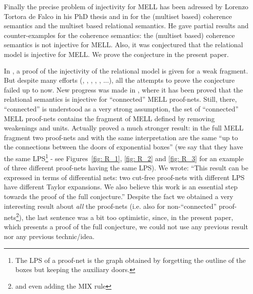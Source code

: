 \documentclass{article}
\theoremstyle{plain}
\begin{document}
Finally the precise problem of  injectivity for MELL has been adressed by Lorenzo Tortora de Falco in his PhD thesis \cite{phdtortora} and in \cite{injectcoh} for the (multiset based) coherence semantics and the multiset based relational semantics. 
He gave partial results and counter-examples for the coherence semantics: the (multiset based) coherence semantics is not injective for MELL.  
Also, it was conjectured that the relational model is
injective for MELL. We prove the conjecture in the present paper.



In \cite{injectcoh}, a proof of the injectivity of the relational model is given for a weak fragment. 
But despite many efforts (\cite{phdtortora}, \cite{injectcoh}, \cite{boudesunifying}, \cite{pagani06a}, \cite{separationdiff}, \cite{taylorexpansioninverse}...), all
the attempts to prove the conjecture failed up to now. 
New progress was made in \cite{LPSinjectivity}, where it has been proved that the relational semantics is injective for ``connected'' MELL proof-nets. Still, there, ``connected'' is understood as a very strong assumption, the set of ``connected'' MELL proof-nets contains the fragment of MELL defined by removing weakenings and units. Actually \cite{LPSinjectivity} proved a much stronger result: in the full MELL fragment two proof-nets  and  with the same
interpretation are the same ``up to the connections between the doors of exponential
boxes'' (we say that they have the same LPS\footnote{The LPS of a proof-net is the graph obtained by forgetting the outline of the boxes but keeping the auxiliary doors.} - see Figures~\ref{fig: R_1}, \ref{fig: R_2} and \ref{fig: R_3} for an example of three different proof-nets having the same LPS). We wrote: ``This result can be expressed in terms of differential nets: two cut-free proof-nets with different LPS have different Taylor expansions. We also believe this work is an essential step
towards the proof of the full conjecture.'' Despite the fact we obtained a very interesting result about \emph{all} the proof-nets (i.e. also for non-``connected'' proof-nets\footnote{and even adding the MIX rule}), the last sentence was a bit too optimistic, since, in the present paper, which presents a proof of the full conjecture, we could not use any previous result nor any previous technic/idea.
\end{document}
